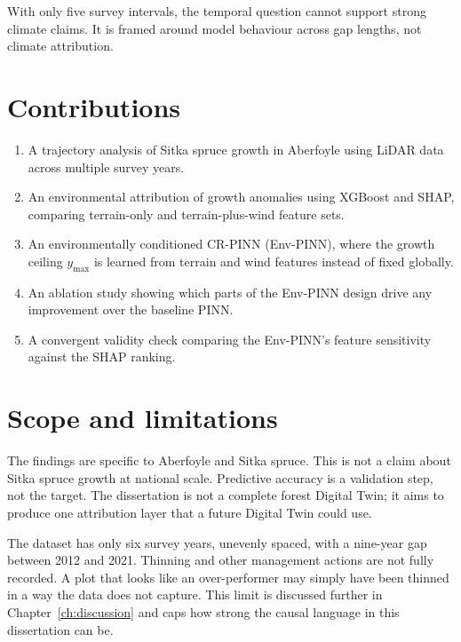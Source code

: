 With only five survey intervals, the temporal question cannot support strong climate claims. It is framed around model behaviour across gap lengths, not climate attribution.

\section{Contributions}

\begin{enumerate}
  \item A trajectory analysis of Sitka spruce growth in Aberfoyle using LiDAR data across multiple survey years.
  \item An environmental attribution of growth anomalies using XGBoost and SHAP, comparing terrain-only and terrain-plus-wind feature sets.
  \item An environmentally conditioned CR-PINN (Env-PINN), where the growth ceiling $y_{\max}$ is learned from terrain and wind features instead of fixed globally.
  \item An ablation study showing which parts of the Env-PINN design drive any improvement over the baseline PINN.
  \item A convergent validity check comparing the Env-PINN's feature sensitivity against the SHAP ranking.
\end{enumerate}

\section{Scope and limitations}

The findings are specific to Aberfoyle and Sitka spruce. This is not a claim about Sitka spruce growth at national scale. Predictive accuracy is a validation step, not the target. The dissertation is not a complete forest Digital Twin; it aims to produce one attribution layer that a future Digital Twin could use.

The dataset has only six survey years, unevenly spaced, with a nine-year gap between 2012 and 2021. Thinning and other management actions are not fully recorded. A plot that looks like an over-performer may simply have been thinned in a way the data does not capture. This limit is discussed further in Chapter~\ref{ch:discussion} and caps how strong the causal language in this dissertation can be.
